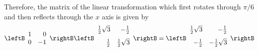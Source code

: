 \begin{solution}
Therefore, the matrix of the linear transformation which first rotates
through $\pi /6$ and then reflects through the $x$ axis is given by 
\begin{equation*}
\leftB
\begin{array}{rr}
1 & 0 \\
0 & -1
\end{array}
\rightB \leftB
\begin{array}{rr}
\vspace{0.05in}\frac{1}{2}\sqrt{3} & -\vspace{0.05in}\frac{1}{2} \\
\vspace{0.05in}\frac{1}{2} & \vspace{0.05in}\frac{1}{2}\sqrt{3}
\end{array}
\rightB =\allowbreak \leftB
\begin{array}{rr}
\vspace{0.05in}\frac{1}{2}\sqrt{3} & -\vspace{0.05in}\frac{1}{2} \\
-\vspace{0.05in}\frac{1}{2} & -\vspace{0.05in}\frac{1}{2}\sqrt{3}
\end{array}
\rightB 
\end{equation*}
\end{solution}